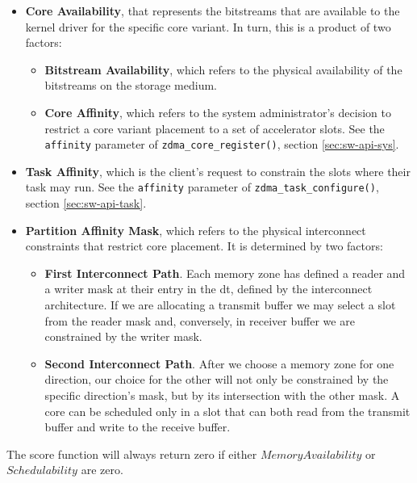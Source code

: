 \begin{itemize}
\item	\textbf{Core Availability}, that represents the bitstreams that are available to the kernel driver 
	for the specific core variant. In turn, this is a product of two factors:
	\begin{itemize}
	\item	\textbf{Bitstream Availability}, which refers to the physical availability of the bitstreams on the storage medium.
	\item	\textbf{Core Affinity}, which refers to the system administrator's decision to restrict a core variant placement to
		a set of accelerator slots.
		See the \texttt{affinity} parameter of \texttt{zdma\_core\_register()}, section \ref{sec:sw-api-sys}.
	\end{itemize}
\item	\textbf{Task Affinity}, which is the client's request to constrain the slots where their task may run.
	See the \texttt{affinity} parameter of \texttt{zdma\_task\_configure()}, section \ref{sec:sw-api-task}.
\item	\textbf{Partition Affinity Mask}, which refers to the physical interconnect constraints that restrict core placement.
	It is determined by two factors:
	\begin{itemize}
	\item	\textbf{First Interconnect Path}. Each memory zone has defined a reader and a writer mask 
		at their entry in the \gls{dt}, defined by the interconnect architecture.
		If we are allocating a transmit buffer we may select a slot from the reader mask and, conversely,
		in receiver buffer we are constrained by the writer mask.
	\item	\textbf{Second Interconnect Path}. After we choose a memory zone for one direction,
		our choice for the other will not only be constrained by the specific direction's mask, but by its intersection with the other mask.
		A core can be scheduled only in a slot that can both read from the transmit buffer and write to the receive buffer.
	\end{itemize}
\end{itemize}

The score function will always return zero if either $MemoryAvailability$ or $Schedulability$ are zero. 

